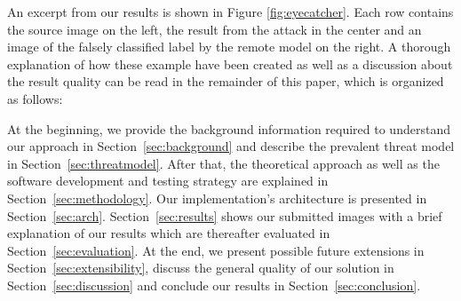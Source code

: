 An excerpt from our results is shown in Figure \ref{fig:eyecatcher}. 
Each row contains the source image on the left, the result from the attack in the center and an image of the falsely classified label by the remote model on the right.
A thorough explanation of how these example have been created as well as a discussion about the result quality can be read in the remainder of this paper, which is organized as follows:

At the beginning, we provide the background information required to understand our approach in Section~\ref{sec:background} and describe the prevalent threat model in Section~\ref{sec:threatmodel}.
After that, the theoretical approach as well as the software development and testing strategy are explained in Section~\ref{sec:methodology}.
Our implementation's architecture is presented in Section~\ref{sec:arch}.
Section~\ref{sec:results} shows our submitted images with a brief explanation of our results which are thereafter evaluated in Section~\ref{sec:evaluation}.
At the end, we present possible future extensions in Section~\ref{sec:extensibility}, discuss the general quality of our solution in Section~\ref{sec:discussion} and conclude our results in Section~\ref{sec:conclusion}.